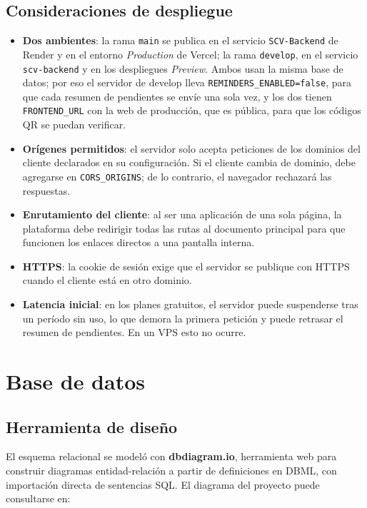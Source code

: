 \documentclass[11pt,letterpaper]{article}
\newcommand{\code}[1]{\nolinkurl{#1}}
\begin{document}
\subsection{Consideraciones de despliegue}
\begin{itemize}
  \item \textbf{Dos ambientes}: la rama \code{main} se publica en el servicio \code{SCV-Backend} de Render y en el entorno \emph{Production} de Vercel; la rama \code{develop}, en el servicio \code{scv-backend} y en los despliegues \emph{Preview}. Ambos usan la misma base de datos; por eso el servidor de develop lleva \code{REMINDERS_ENABLED=false}, para que cada resumen de pendientes se envíe una sola vez, y los dos tienen \code{FRONTEND_URL} con la web de producción, que es pública, para que los códigos QR se puedan verificar.
  \item \textbf{Orígenes permitidos}: el servidor solo acepta peticiones de los dominios del cliente declarados en su configuración. Si el cliente cambia de dominio, debe agregarse en \code{CORS_ORIGINS}; de lo contrario, el navegador rechazará las respuestas.
  \item \textbf{Enrutamiento del cliente}: al ser una aplicación de una sola página, la plataforma debe redirigir todas las rutas al documento principal para que funcionen los enlaces directos a una pantalla interna.
  \item \textbf{HTTPS}: la cookie de sesión exige que el servidor se publique con HTTPS cuando el cliente está en otro dominio.
  \item \textbf{Latencia inicial}: en los planes gratuitos, el servidor puede suspenderse tras un período sin uso, lo que demora la primera petición y puede retrasar el resumen de pendientes. En un VPS esto no ocurre.
\end{itemize}

\section{Base de datos}

\subsection{Herramienta de diseño}
El esquema relacional se modeló con \textbf{dbdiagram.io}, herramienta web para construir diagramas entidad-relación a partir de definiciones en DBML, con importación directa de sentencias SQL. El diagrama del proyecto puede consultarse en:
\end{document}
